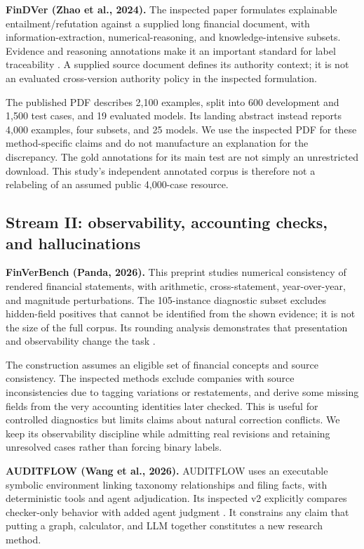 \documentclass[11pt,a4paper]{article}
\newcommand{\pbreak}{\clearpage}
\newcommand{\lead}[1]{\textbf{\color{navy}#1}}
\begin{document}
\lead{FinDVer (Zhao et al., 2024).} The inspected paper formulates explainable entailment/refutation against a supplied long financial document, with information-extraction, numerical-reasoning, and knowledge-intensive subsets. Evidence and reasoning annotations make it an important standard for label traceability \cite{findver}. A supplied source document defines its authority context; it is not an evaluated cross-version authority policy in the inspected formulation.

The published PDF describes 2,100 examples, split into 600 development and 1,500 test cases, and 19 evaluated models. Its landing abstract instead reports 4,000 examples, four subsets, and 25 models. We use the inspected PDF for these method-specific claims and do not manufacture an explanation for the discrepancy. The gold annotations for its main test are not simply an unrestricted download. This study's independent annotated corpus is therefore not a relabeling of an assumed public 4,000-case resource.

\pbreak
\subsection{Stream II: observability, accounting checks, and hallucinations}
\lead{FinVerBench (Panda, 2026).} This preprint studies numerical consistency of rendered financial statements, with arithmetic, cross-statement, year-over-year, and magnitude perturbations. The 105-instance diagnostic subset excludes hidden-field positives that cannot be identified from the shown evidence; it is not the size of the full corpus. Its rounding analysis demonstrates that presentation and observability change the task \cite{finverbench}.

The construction assumes an eligible set of financial concepts and source consistency. The inspected methods exclude companies with source inconsistencies due to tagging variations or restatements, and derive some missing fields from the very accounting identities later checked. This is useful for controlled diagnostics but limits claims about natural correction conflicts. We keep its observability discipline while admitting real revisions and retaining unresolved cases rather than forcing binary labels.

\lead{AUDITFLOW (Wang et al., 2026).} AUDITFLOW uses an executable symbolic environment linking taxonomy relationships and filing facts, with deterministic tools and agent adjudication. Its inspected v2 explicitly compares checker-only behavior with added agent judgment \cite{auditflow}. It constrains any claim that putting a graph, calculator, and LLM together constitutes a new research method.
\end{document}
